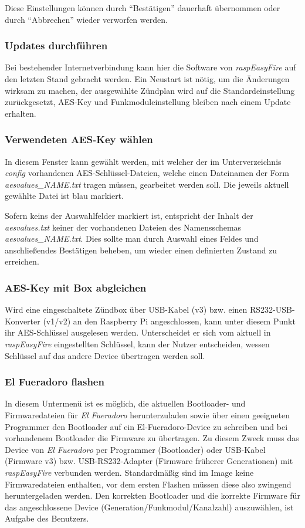 \documentclass[paper=a4, parskip, numbers=noenddot, toc=listof, headsepline]{scrbook}
\newcommand{\anlage}{\emph{El Fueradoro}}
\newcommand{\REF}{\emph{raspEasyFire}}
\begin{document}
					Diese Einstellungen können durch \enquote{Bestätigen} dauerhaft übernommen oder durch \enquote{Abbrechen} wieder verworfen werden.

			    \subsubsection{Updates durchführen}
					Bei bestehender Internetverbindung kann hier die Software von \REF{} auf den letzten Stand gebracht werden. Ein Neustart ist nötig, um die Änderungen wirksam zu machen, der ausgewählte Zündplan wird auf die Standardeinstellung zurückgesetzt, AES-Key und Funkmoduleinstellung bleiben nach einem Update erhalten.
				
				\subsubsection{Verwendeten AES-Key wählen}
					In diesem Fenster kann gewählt werden, mit welcher der im Unterverzeichnis \emph{config} vorhandenen AES-Schlüssel-Dateien, welche einen Dateinamen der Form \emph{aesvalues\_NAME.txt} tragen müssen, gearbeitet werden soll. Die jeweils aktuell gewählte Datei ist blau markiert.
					
					Sofern keins der Auswahlfelder markiert ist, entspricht der Inhalt der \emph{aesvalues.txt} keiner der vorhandenen Dateien des Namensschemas \emph{aesvalues\_NAME.txt}. Dies sollte man durch Auswahl eines Feldes und anschließendes Bestätigen beheben, um wieder einen definierten Zustand zu erreichen.
				
				\subsubsection{AES-Key mit Box abgleichen}
					Wird eine eingeschaltete Zündbox über USB-Kabel (v3) bzw. einen RS232-USB-Konverter (v1/v2) an den Raspberry Pi angeschlossen, kann unter diesem Punkt ihr AES-Schlüssel ausgelesen werden. Unterscheidet er sich vom aktuell in {\REF} eingestellten Schlüssel, kann der Nutzer entscheiden, wessen Schlüssel auf das andere Device übertragen werden soll.				
				
				\subsubsection{El Fueradoro flashen}
					In diesem Untermenü ist es möglich, die aktuellen Bootloader- und Firmwaredateien für \anlage{} herunterzuladen sowie über einen geeigneten Programmer den Bootloader auf ein El-Fueradoro-Device zu schreiben und bei vorhandenem Bootloader die Firmware zu übertragen. Zu diesem Zweck muss das Device von {\anlage} per Programmer (Bootloader) oder USB-Kabel (Firmware v3) bzw. USB-RS232-Adapter (Firmware früherer Generationen) mit \emph{raspEasyFire} verbunden werden. Standardmäßig sind im Image keine Firmwaredateien enthalten, vor dem ersten Flashen müssen diese also zwingend heruntergeladen werden. Den korrekten Bootloader und die korrekte Firmware für das angeschlossene Device (Generation/Funkmodul/Kanalzahl) auszuwählen, ist Aufgabe des Benutzers.
\end{document}
